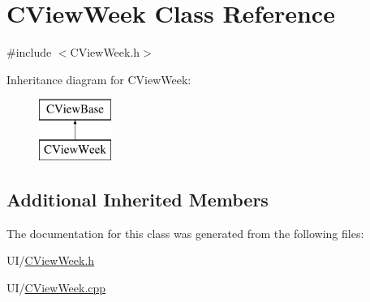 \hypertarget{class_c_view_week}{}\section{C\+View\+Week Class Reference}
\label{class_c_view_week}


{\ttfamily \#include $<$C\+View\+Week.\+h$>$}

Inheritance diagram for C\+View\+Week\+:\begin{figure}[H]
\begin{center}
\leavevmode
\includegraphics[height=2.000000cm]{class_c_view_week}
\end{center}
\end{figure}
\subsection*{Additional Inherited Members}


The documentation for this class was generated from the following files\+:\begin{DoxyCompactItemize}
\item 
U\+I/\mbox{\hyperlink{_c_view_week_8h}{C\+View\+Week.\+h}}\item 
U\+I/\mbox{\hyperlink{_c_view_week_8cpp}{C\+View\+Week.\+cpp}}\end{DoxyCompactItemize}
